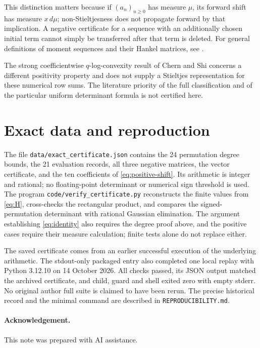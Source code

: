 \documentclass[11pt]{article}
\begin{document}
This distinction matters because if $(a_n)_{n\geq0}$ has measure
$\mu$, its forward shift has measure $x\,d\mu$; non-Stieltjesness
does not propagate forward by that implication. A negative certificate
for a sequence with an additionally chosen initial term cannot simply
be transferred after that term is deleted. For general definitions
of moment sequences and their Hankel matrices, see \cite{WZ}.

The strong coefficientwise $q$-log-convexity result of Chern and Shi
\cite[Theorem 1.2]{CS} concerns a different positivity property and
does not supply a Stieltjes representation for these numerical
row sums. The literature priority of the full classification and
of the particular uniform determinant formula is not certified here.

\section{Exact data and reproduction}

The file \texttt{data/exact\_certificate.json} contains the 24
permutation degree bounds, the 21 evaluation records, all three
negative matrices, the vector certificate, and the ten coefficients
of \eqref{eq:positive-shift}. Its arithmetic is integer and rational;
no floating-point determinant or numerical sign threshold is used.
The program \texttt{code/verify\_certificate.py} reconstructs the
finite values from \eqref{eq:H}, cross-checks the rectangular product,
and compares the signed-permutation determinant with rational
Gaussian elimination. The argument establishing \eqref{eq:identity}
also requires the degree proof above, and the positive cases require
their measure calculation; finite tests alone do not replace either.

The saved certificate comes from an earlier successful execution of
the underlying arithmetic. The stdout-only packaged entry also completed one local replay with
Python 3.12.10 on 14 October 2026. All checks passed, its JSON output
matched the archived certificate, and child, guard and shell exited
zero with empty stderr. No original
author full suite is claimed to have been rerun. The precise historical
record and the minimal command are described in
\texttt{REPRODUCIBILITY.md}.

\paragraph{Acknowledgement.}
This note was prepared with AI assistance.
\end{document}
